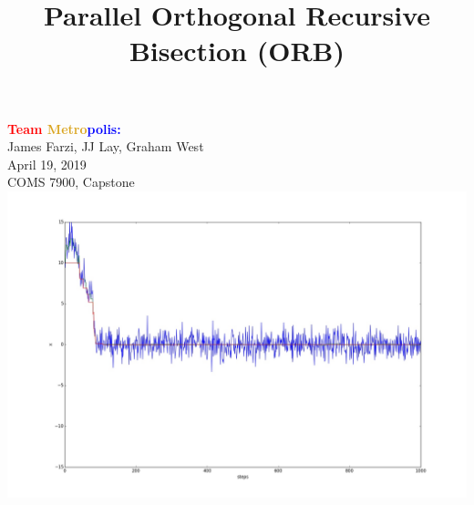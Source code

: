 \documentclass[usernames,dvipsnames]{beamer}
\title[Capstone]{Parallel Orthogonal Recursive Bisection (ORB)}
\date{}
\begin{document}
\begin{frame}
	\titlepage
	
	\vspace{-65pt}
		
		\centering
		\textbf{\textcolor{red}{Team} \textcolor{Goldenrod}{Metro}\textcolor{blue}{polis:}} \\
		James Farzi, JJ Lay, Graham West \\
		\vspace{10pt}
		April 19, 2019 \\
		\vspace{10pt}
		COMS 7900, Capstone \\
		\includegraphics[scale = 0.1]{images/PosterPlot_Ackley_Chain_good_00}
	\endminipage\hfill %
		\centering

\end{frame}
\end{document}
